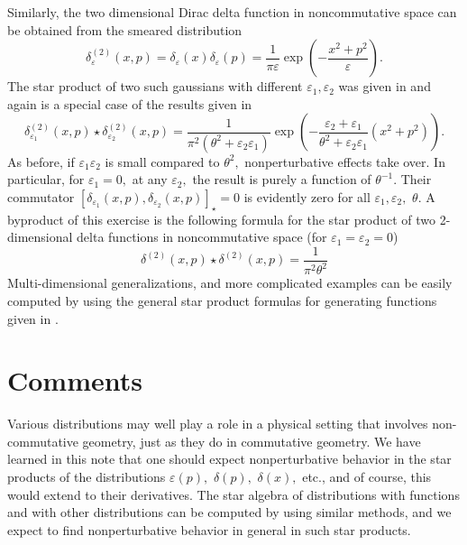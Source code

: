 \documentclass[a4paper,12pt]{article}
\begin{document}
Similarly, the two dimensional Dirac delta function in noncommutative space
can be obtained from the smeared distribution
\begin{equation}
\delta _{\varepsilon }^{\left( 2\right) }\left( x,p\right) =\delta
_{\varepsilon }\left( x\right) \delta _{\varepsilon }\left( p\right) =\frac{1%
}{\pi \varepsilon }\exp \left( -\frac{x^{2}+p^{2}}{\varepsilon }\right) .
\end{equation}
The star product of two such gaussians with different $\varepsilon
_{1},\varepsilon _{2}$ was given in \cite{bayen}\cite{baker} and again is a
special case of the results given in \cite{witmoy}
\begin{equation}
\delta _{\varepsilon _{1}}^{\left( 2\right) }\left( x,p\right) \star \delta
_{\varepsilon _{2}}^{\left( 2\right) }\left( x,p\right) =\frac{1}{\pi
^{2}\left( \theta ^{2}+\varepsilon _{2}\varepsilon _{1}\right) }\exp \left( -%
\frac{\varepsilon _{2}+\varepsilon _{1}}{\theta ^{2}+\varepsilon
_{2}\varepsilon _{1}}\left( x^{2}+p^{2}\right) \right) .
\end{equation}
As before, if $\varepsilon _{1}\varepsilon _{2}$ is small compared to $%
\theta ^{2},$ nonperturbative effects take over. In particular, for $%
\varepsilon _{1}=0,$ at any $\varepsilon _{2},$ the result is purely a
function of $\theta ^{-1}.$ Their commutator $\left[ \delta _{\varepsilon
_{1}}\left( x,p\right) ,\delta _{\varepsilon _{2}}\left( x,p\right) \right]
_{\star }=0$ is evidently zero for all $\varepsilon _{1},\varepsilon _{2},$ $%
\theta .$ A byproduct of this exercise is the following formula for the star
product of two 2-dimensional delta functions in noncommutative space (for $%
\varepsilon _{1}=\varepsilon _{2}=0$)
\begin{equation}
\delta ^{\left( 2\right) }\left( x,p\right) \star \delta ^{\left( 2\right)
}\left( x,p\right) =\frac{1}{\pi ^{2}\theta ^{2}}
\end{equation}
Multi-dimensional generalizations, and more complicated examples can be
easily computed by using the general star product formulas for generating
functions given in \cite{witmoy}.

\section{Comments}

Various distributions may well play a role in a physical setting that
involves non-commutative geometry, just as they do in commutative geometry.
We have learned in this note that one should expect nonperturbative behavior
in the star products of the distributions $\varepsilon \left( p\right) ,$ $%
\delta \left( p\right) ,$ $\delta \left( x\right) ,$ etc., and of course,
this would extend to their derivatives. The star algebra of distributions
with functions and with other distributions can be computed by using similar
methods, and we expect to find nonperturbative behavior in general in such
star products.
\end{document}
